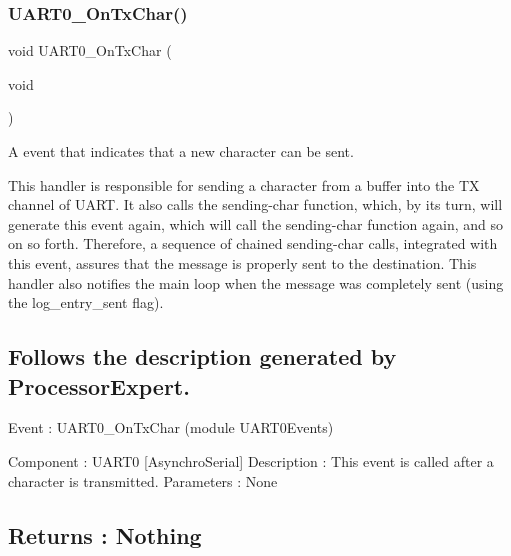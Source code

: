 \subsubsection{\texorpdfstring{U\+A\+R\+T0\+\_\+\+On\+Tx\+Char()}{UART0\_OnTxChar()}}
{\footnotesize\ttfamily void U\+A\+R\+T0\+\_\+\+On\+Tx\+Char (\begin{DoxyParamCaption}\item[{void}]{ }\end{DoxyParamCaption})}



A event that indicates that a new character can be sent. 

This handler is responsible for sending a character from a buffer into the TX channel of U\+A\+RT. It also calls the sending-\/char function, which, by its turn, will generate this event again, which will call the sending-\/char function again, and so on so forth. Therefore, a sequence of chained sending-\/char calls, integrated with this event, assures that the message is properly sent to the destination. This handler also notifies the main loop when the message was completely sent (using the log\+\_\+entry\+\_\+sent flag).

\subsection*{Follows the description generated by Processor\+Expert. }

Event \+: U\+A\+R\+T0\+\_\+\+On\+Tx\+Char (module U\+A\+R\+T0\+Events)

Component \+: U\+A\+R\+T0 \mbox{[}Asynchro\+Serial\mbox{]} Description \+: This event is called after a character is transmitted. Parameters \+: None \subsection*{Returns \+: Nothing }